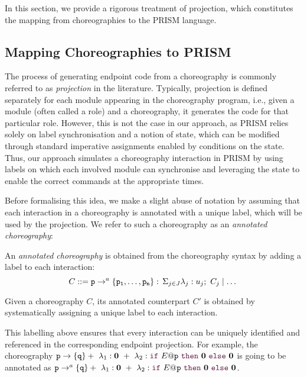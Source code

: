 In this section, we provide a rigorous treatment of projection, which
constitutes the mapping from choreographies to the PRISM language.
%

\subsection{Mapping Choreographies to PRISM} 
%
The process of generating endpoint code from a choreography is
commonly referred to as {\em projection} in the literature.
Typically, projection is defined separately for each module appearing
in the choreography program, i.e., given a module (often called a
role) and a choreography, it generates the code for that particular
role.  However, this is not the case in our approach, as PRISM relies
solely on label synchronisation and a notion of state, which can be
modified through standard imperative assignments enabled by conditions
on the state.
%
Thus, our approach simulates a choreography interaction in PRISM by
using labels on which each involved module can synchronise and
leveraging the state to enable the correct commands at the appropriate
times.

Before formalising this idea, we make a slight abuse of notation by
assuming that each interaction in a choreography is annotated with a
unique label, which will be used by the projection. We refer to such a
choreography as an {\em annotated choreography}:
%
\begin{definition}
  An \emph{annotated choreography} is obtained from the choreography
  syntax by adding a label to each interaction:
  \[C ::= \mathtt{p}\rightarrow^{a} \{\mathtt{\mathtt{p}_1,\ldots,\mathtt{p}_n}\}:\,\Sigma_{j\in J}\lambda_j: u_j;\ C_j \mid\dots\]

  Given a choreography \( C \), its annotated counterpart \( C' \) is
  obtained by systematically assigning a unique label to each
  interaction. 
\end{definition}
This labelling above ensures that every interaction can be uniquely
identified and referenced in the corresponding endpoint projection.
For example, the choreography
% 
$\interactBase{p}{q} +\ \lambda_1: \CEnd \ +\ \lambda_2: 
% 
\ifTE 
%
{E}{p}{\CEnd}{\CEnd}$
% 
is going to be annotated as
$\interactBasel{p}{a}{q}+\ \lambda_1:\CEnd\ +\ \lambda_2:
%
\ifTEl {E}{}{p}{\CEnd}{\CEnd}$.

